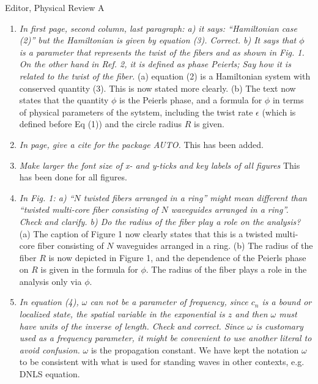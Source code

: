 \documentclass[11pt]{letter}
\begin{document}
\begin{letter}{Editor, Physical Review A}
\begin{enumerate}
\item \emph{In first page, second column, last paragraph: a) it says: ``Hamiltonian case (2)'' but the Hamiltonian is given by equation (3). Correct. b) It says that $\phi$ is a parameter that represents the twist of the fibers and as shown in Fig. 1. On the other hand in Ref. 2, it is defined as phase Peierls; Say how it is related to the twist of the fiber.} (a) equation (2) is a Hamiltonian system with conserved quantity (3). This is now stated more clearly. (b) The text now states that the quantity $\phi$ is the Peierls phase, and a formula for $\phi$ in terms of physical parameters of the sytstem, including the twist rate $\epsilon$ (which is defined before Eq (1)) and the circle radius $R$ is given.

\item \emph{In page, give a cite for the package AUTO.} This has been added.

\item \emph{Make larger the font size of x- and y-ticks and key labels of all figures} This has been done for all figures.

\item \emph{In Fig. 1: a) ``$N$ twisted fibers arranged in a ring'' might mean different than ``twisted multi-core fiber consisting of $N$ waveguides arranged in a ring''. Check and clarify. b) Do the radius of the fiber play a role on the analysis?} (a) The caption of Figure 1 now clearly states that this is a twisted multi-core fiber consisting of $N$ waveguides arranged in a ring. (b) The radius of the fiber $R$ is now depicted in Figure 1, and the dependence of the Peierls phase on $R$ is given in the formula for $\phi$. The radius of the fiber plays a role in the analysis only via $\phi$.

\item \emph{In equation (4), $\omega$ can not be a parameter of frequency, since $c_n$ is a bound or localized state, the spatial variable in the exponential is $z$ and then $\omega$ must have units of the inverse of length. Check and correct. Since $\omega$ is customary used as a frequency parameter, it might be convenient to use another literal to avoid confusion.} $\omega$ is the propagation constant. We have kept the notation $\omega$ to be consistent with what is used for standing waves in other contexts, e.g. DNLS equation.


\end{enumerate}
\end{letter}
\end{document}
